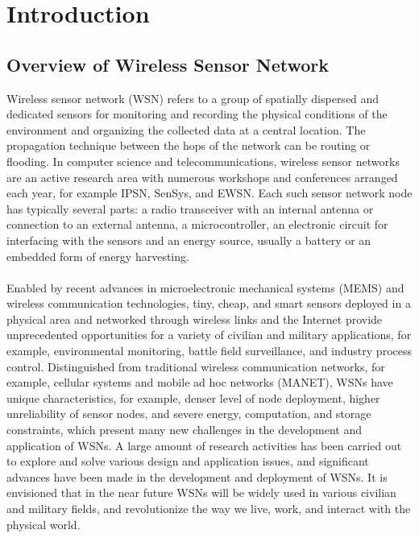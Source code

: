 \chapter{\textbf{Introduction}}
\section{Overview of Wireless Sensor Network}
Wireless sensor network (WSN) refers to a group of spatially dispersed and dedicated sensors for monitoring and recording the physical conditions of the environment and organizing the collected data at a central location. The propagation technique between the hops of the network can be routing or flooding. In computer science and telecommunications, wireless sensor networks are an active research area with numerous workshops and conferences arranged each year, for example IPSN, SenSys, and EWSN. Each such sensor network node has typically several parts: a radio transceiver with an internal antenna or connection to an external antenna, a microcontroller, an electronic circuit for interfacing with the sensors and an energy source, usually a battery or an embedded form of energy harvesting.\\\\
Enabled by recent advances in microelectronic mechanical systems (MEMS) and wireless communication technologies, tiny, cheap, and smart sensors deployed in a physical area and networked through wireless links and the Internet provide unprecedented opportunities for a variety of civilian and military applications, for example, environmental monitoring, battle field surveillance, and industry process control. Distinguished from traditional wireless communication networks, for example, cellular systems and mobile ad hoc networks (MANET), WSNs have unique characteristics, for example, denser level of node deployment, higher unreliability of sensor nodes, and severe energy, computation, and storage constraints, which present many new challenges in the development and application of WSNs. A large amount of research activities has been carried out to explore and solve various design and application issues, and significant advances have been made in the development and deployment of WSNs. It is envisioned that in the near future WSNs will be widely used in various civilian and military fields, and revolutionize the way we live, work, and interact with the physical world.

